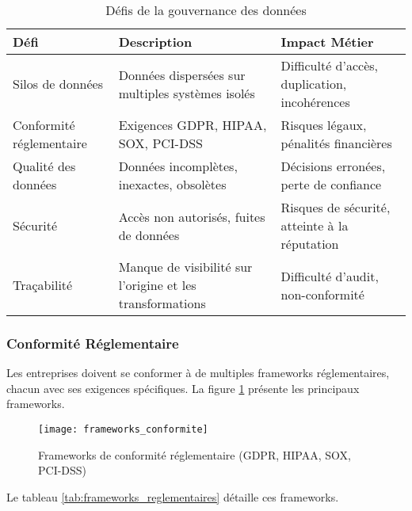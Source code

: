 \begin{table}[htpb]
\centering
\caption{Défis de la gouvernance des données}
\label{tab:defis_gouvernance}
\begin{tabular}{|p{}|p{}|p{}|}
\hline
\textbf{Défi} & \textbf{Description} & \textbf{Impact Métier} \\
\hline
Silos de données & Données dispersées sur multiples systèmes isolés & Difficulté d'accès, duplication, incohérences \\
\hline
Conformité réglementaire & Exigences GDPR, HIPAA, SOX, PCI-DSS & Risques légaux, pénalités financières \\
\hline
Qualité des données & Données incomplètes, inexactes, obsolètes & Décisions erronées, perte de confiance \\
\hline
Sécurité & Accès non autorisés, fuites de données & Risques de sécurité, atteinte à la réputation \\
\hline
Traçabilité & Manque de visibilité sur l'origine et les transformations & Difficulté d'audit, non-conformité \\
\hline
\end{tabular}
\end{table}

\subsubsection{Conformité Réglementaire}

Les entreprises doivent se conformer à de multiples frameworks réglementaires, chacun avec ses exigences spécifiques. La figure \ref{fig:frameworks_conformite} présente les principaux frameworks.

\begin{figure}[htpb]
\centering
\texttt{[image: frameworks\_conformite]}
\caption{Frameworks de conformité réglementaire (GDPR, HIPAA, SOX, PCI-DSS)}
\label{fig:frameworks_conformite}
\end{figure}

Le tableau \ref{tab:frameworks_reglementaires} détaille ces frameworks.

